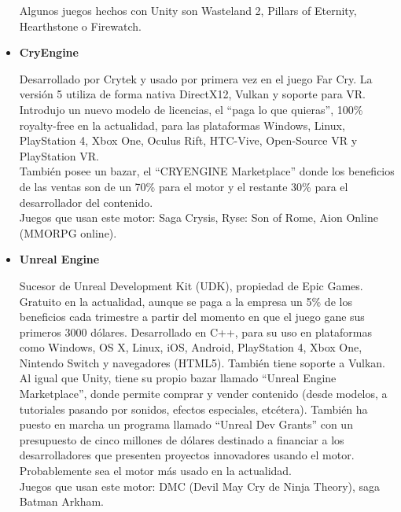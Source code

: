 \begin{itemize}
\quad Algunos juegos hechos con Unity son Wasteland 2, Pillars of Eternity, Hearthstone o Firewatch.\\ 

\item{\textbf{CryEngine}}

\quad Desarrollado por Crytek y usado por primera vez en el juego Far Cry. La versión 5 utiliza de forma nativa DirectX12, Vulkan y soporte para VR.\\  

\quad Introdujo un nuevo modelo de licencias, el “paga lo que quieras”, 100\% royalty-free en la actualidad, para las plataformas Windows, Linux, PlayStation 4, Xbox One, Oculus Rift, HTC-Vive, Open-Source VR y PlayStation VR.\\ 

\quad También posee un bazar, el “CRYENGINE Marketplace” donde los beneficios de las ventas son de un 70\% para el motor y el restante 30\% para el desarrollador del contenido.\\

\quad Juegos que usan este motor: Saga Crysis, Ryse: Son of Rome, Aion Online (MMORPG online).\\

\item{\textbf{Unreal Engine}}

\quad Sucesor de Unreal Development Kit (UDK), propiedad de Epic Games. Gratuito en la actualidad, aunque se paga a la empresa un 5\% de los beneficios cada trimestre a partir del momento en que el juego gane sus primeros 3000 dólares. Desarrollado en C++, para su uso en plataformas como Windows, OS X, Linux, iOS, Android, PlayStation 4, Xbox One, Nintendo Switch y navegadores (HTML5). También tiene soporte a Vulkan.\\

\quad Al igual que Unity, tiene su propio bazar llamado “Unreal Engine Marketplace”, donde permite comprar y vender contenido (desde modelos, a tutoriales pasando por sonidos, efectos especiales, etcétera). También ha puesto en marcha un programa llamado “Unreal Dev Grants” con un presupuesto de cinco millones de dólares destinado a financiar a los desarrolladores que presenten proyectos innovadores usando el motor. Probablemente sea el motor más usado en la actualidad.\\

\quad Juegos que usan este motor: DMC (Devil May Cry de Ninja Theory), saga Batman Arkham.\\


\end{itemize}
